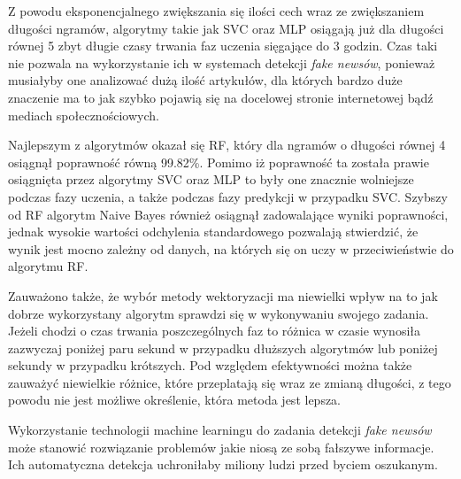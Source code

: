 Z powodu eksponencjalnego zwiększania się ilości cech wraz ze zwiększaniem długości ngramów, 
algorytmy takie jak SVC oraz MLP osiągają już dla długości równej 5 zbyt długie czasy trwania faz uczenia sięgające 
do 3 godzin. Czas taki nie pozwala na wykorzystanie ich w systemach detekcji \textit{fake newsów}, ponieważ
musiałyby one analizować dużą ilość artykułów, dla których bardzo duże znaczenie ma to jak 
szybko pojawią się na docelowej stronie internetowej bądź mediach społecznościowych.

Najlepszym z algorytmów okazał się RF, który dla ngramów o długości równej 4
osiągnął poprawność równą 99.82\%. Pomimo iż poprawność ta została prawie osiągnięta przez algorytmy
SVC oraz MLP to były one znacznie wolniejsze podczas fazy uczenia, a także podczas fazy 
predykcji w przypadku SVC. Szybszy od RF algorytm Naive Bayes również osiągnął zadowalające wyniki poprawności,
jednak wysokie wartości odchylenia standardowego pozwalają stwierdzić, że wynik jest mocno zależny od 
danych, na których się on uczy w przeciwieństwie do algorytmu RF.

Zauważono także, że wybór metody wektoryzacji ma niewielki wpływ na to jak dobrze wykorzystany algorytm 
sprawdzi się w wykonywaniu swojego zadania. Jeżeli chodzi o czas trwania poszczególnych faz to 
różnica w czasie wynosiła zazwyczaj poniżej paru sekund w przypadku dłuższych algorytmów lub poniżej 
sekundy w przypadku krótszych. Pod względem efektywności można także zauważyć niewielkie różnice,
które przeplatają się
wraz ze zmianą długości, z tego powodu nie jest możliwe określenie, która metoda jest lepsza.

Wykorzystanie technologii machine learningu do zadania detekcji \textit{fake newsów} 
może stanowić rozwiązanie problemów jakie niosą ze sobą fałszywe informacje. Ich automatyczna 
detekcja uchroniłaby miliony ludzi przed byciem oszukanym. 
